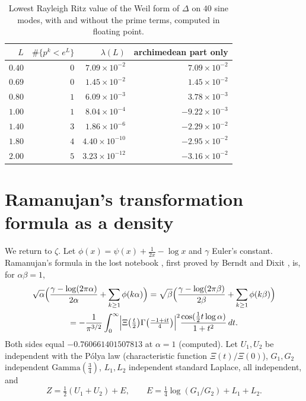 \begin{table}[htbp]
\centering\small
\begin{tabular}{rrrr}
\toprule
$L$ & $\#\{p^k<e^L\}$ & $\lambda(L)$ & archimedean part only\\
\midrule
$0.40$ & $0$ & $7.09\times10^{-2}$ & $7.09\times10^{-2}$\\
$0.69$ & $0$ & $1.45\times10^{-2}$ & $1.45\times10^{-2}$\\
$0.80$ & $1$ & $6.09\times10^{-3}$ & $3.78\times10^{-3}$\\
$1.00$ & $1$ & $8.04\times10^{-4}$ & $-9.22\times10^{-3}$\\
$1.40$ & $3$ & $1.86\times10^{-6}$ & $-2.29\times10^{-2}$\\
$1.80$ & $4$ & $4.40\times10^{-10}$ & $-2.95\times10^{-2}$\\
$2.00$ & $5$ & $3.23\times10^{-12}$ & $-3.16\times10^{-2}$\\
\bottomrule
\end{tabular}
\caption{Lowest Rayleigh Ritz value of the Weil form of $\Delta$ on $40$ sine modes, with and without the prime terms, computed in floating point.}\label{dl:tab:weil}
\end{table}

\section{Ramanujan's transformation formula as a density}\label{dl:sec:Z}

We return to $\zeta$. Let $\phi(x)=\psi(x)+\frac1{2x}-\log x$ and $\gamma$ Euler's constant. Ramanujan's formula in the lost notebook \cite{NCRamanujanLost88}, first proved by Berndt and Dixit \cite{NCBerndtDixit10}, is, for $\alpha\beta=1$,
\begin{multline}\label{dl:eq:ram}
\sqrt\alpha\Bigl(\frac{\gamma-\log(2\pi\alpha)}{2\alpha}+\sum_{k\ge1}\phi(k\alpha)\Bigr)
=\sqrt\beta\Bigl(\frac{\gamma-\log(2\pi\beta)}{2\beta}+\sum_{k\ge1}\phi(k\beta)\Bigr)\\
=-\frac1{\pi^{3/2}}\int_0^\infty\Bigl|\Xi\bigl(\tfrac t2\bigr)\Gamma\bigl(\tfrac{-1+it}4\bigr)\Bigr|^2\frac{\cos(\frac12t\log\alpha)}{1+t^2}\,dt.
\end{multline}
Both sides equal $-0.760661401507813$ at $\alpha=1$ (computed). Let $U_1,U_2$ be independent with the P\'olya law (characteristic function $\Xi(t)/\Xi(0)$), $G_1,G_2$ independent $\mathrm{Gamma}(\frac34)$, $L_1,L_2$ independent standard Laplace, all independent, and
\[
Z=\tfrac12(U_1+U_2)+E,\qquad E=\tfrac14\log(G_1/G_2)+L_1+L_2 .
\]

